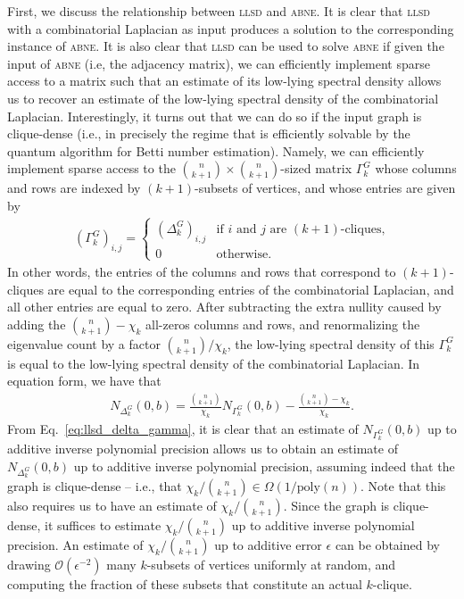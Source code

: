 \documentclass[a4paper, onecolumn, accepted=2022-08-28]{quantumarticle}
\begin{document}
First, we discuss the relationship between \textsc{llsd} and \textsc{abne}.
It is clear that \textsc{llsd} with a combinatorial Laplacian as input produces a solution to the corresponding instance of \textsc{abne}.
It is also clear that \textsc{llsd} can be used to solve \textsc{abne} if given the input of \textsc{abne} (i.e, the adjacency matrix), we can efficiently implement sparse access to a matrix such that an estimate of its low-lying spectral density allows us to recover an estimate of the low-lying spectral density of the combinatorial Laplacian.
Interestingly, it turns out that we can do so if the input graph is clique-dense (i.e., in precisely the regime that is efficiently solvable by the quantum algorithm for Betti number estimation).
Namely, we can efficiently implement sparse access to the $\binom{n}{k+1} \times \binom{n}{k+1}$-sized matrix $\Gamma_k^G$ whose columns and rows are indexed by $(k+1)$-subsets of vertices, and whose entries are given by
\begin{align}
  \left(\Gamma_k^G\right)_{i, j} =
  \begin{cases} (\Delta_k^G)_{i, j} & \text{if $i$ and $j$ are $(k+1)$-cliques,}\\ 0 & \text{otherwise}.
  \end{cases}
\label{eq:gamma_matrix}
\end{align}
In other words, the entries of the columns and rows that correspond to $(k+1)$-cliques are equal to the corresponding entries of the combinatorial Laplacian, and all other entries are equal to zero.
After subtracting the extra nullity caused by adding the $\binom{n}{k+1} - \chi_k$ all-zeros columns and rows, and renormalizing the eigenvalue count by a factor $\binom{n}{k+1}/\chi_k$, the low-lying spectral density of this $\Gamma_k^G$ is equal to the low-lying spectral density of the combinatorial Laplacian.
In equation form, we have that
\begin{align}
  N_{\Delta_k^G}(0, b) = \frac{\binom{n}{k+1}}{\chi_k}N_{\Gamma_k^G}(0, b) - \frac{\binom{n}{k+1} - \chi_k}{\chi_k}.
  \label{eq:llsd_delta_gamma}
\end{align}
From Eq.~\eqref{eq:llsd_delta_gamma}, it is clear that an estimate of $N_{\Gamma_k^G}(0, b)$ up to additive inverse polynomial precision allows us to obtain an estimate of $N_{\Delta_k^G}(0, b)$ up to additive inverse polynomial precision, assuming indeed that the graph is clique-dense -- i.e., that $\chi_k/\binom{n}{k+1} \in \Omega\left(1/\mathrm{poly}(n)\right)$.
Note that this also requires us to have an estimate of $\chi_k/\binom{n}{k+1}$.
Since the graph is clique-dense, it suffices to estimate $\chi_k/\binom{n}{k+1}$ up to additive inverse polynomial precision.
An estimate of $\chi_k/\binom{n}{k+1}$ up to additive error $\epsilon$ can be obtained by drawing $\mathcal{O}(\epsilon^{-2})$ many $k$-subsets of vertices uniformly at random, and computing the fraction of these subsets that constitute an actual $k$-clique.
\end{document}
